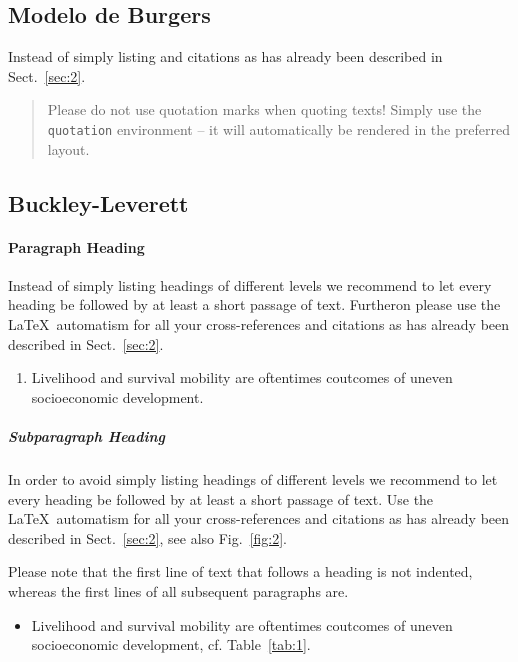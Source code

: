 \enlargethispage{24pt}

\subsection{Modelo de Burgers}
\label{subsec:2}
Instead of simply listing and citations as has already been described in Sect.~\ref{sec:2}.

\begin{quotation}
	Please do not use quotation marks when quoting texts! Simply use the \verb|quotation| environment -- it will automatically be rendered in the preferred layout.
\end{quotation}

\subsection{Buckley-Leverett}

\paragraph{Paragraph Heading} %
Instead of simply listing headings of different levels we recommend to let every heading be followed by at least a short passage of text. Furtheron please use the \LaTeX\ automatism for all your cross-references and citations as has already been described in Sect.~\ref{sec:2}.

\begin{enumerate}
	\item{Livelihood and survival mobility are oftentimes coutcomes of uneven socioeconomic development.}
\end{enumerate}


\subparagraph{Subparagraph Heading} In order to avoid simply listing headings of different levels we recommend to let every heading be followed by at least a short passage of text. Use the \LaTeX\ automatism for all your cross-references and citations as has already been described in Sect.~\ref{sec:2}, see also Fig.~\ref{fig:2}.

Please note that the first line of text that follows a heading is not indented, whereas the first lines of all subsequent paragraphs are.

\begin{itemize}
	\item{Livelihood and survival mobility are oftentimes coutcomes of uneven socioeconomic development, cf. Table~\ref{tab:1}.}
\end{itemize}

